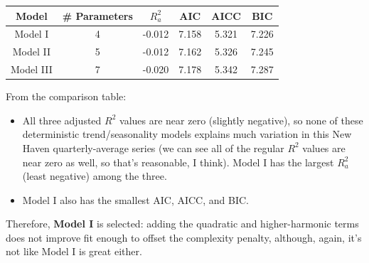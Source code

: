 \documentclass[
  10pt,
]{extarticle}
\begin{document}
\begin{table}[H]
\centering
\begin{tabular}{cccccc}
\toprule
Model & \# Parameters & $R_a^2$ & AIC & AICC & BIC\\
\midrule
Model I & 4 & -0.012 & 7.158 & 5.321 & 7.226\\
Model II & 5 & -0.012 & 7.162 & 5.326 & 7.245\\
Model III & 7 & -0.020 & 7.178 & 5.342 & 7.287\\
\bottomrule
\end{tabular}
\end{table}

From the comparison table:

\bgroup 
  \begin{itemize}[
    itemsep=3pt,
    parsep=0pt,
    topsep=6pt
  ]

\item All three adjusted \(R^2\) values are near zero (slightly negative), so none of these deterministic trend/seasonality models explains much variation in this New Haven quarterly-average series (we can see all of the regular \(R^2\) values are near zero as well, so that's reasonable, I think). Model I has the largest \(R_a^2\) (least negative) among the three.
\item Model I also has the smallest AIC, AICC, and BIC.

  \end{itemize}
\egroup

Therefore, \textbf{Model I} is selected: adding the quadratic and higher-harmonic terms does not improve fit enough to offset the complexity penalty, although, again, it's not like Model I is great either.
\end{document}
